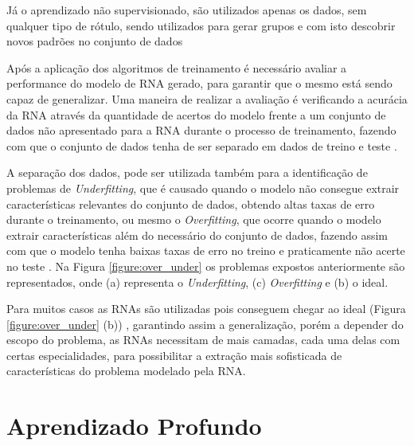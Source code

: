 \par Já o aprendizado não supervisionado, são utilizados apenas os dados, sem qualquer tipo de rótulo, sendo utilizados para gerar grupos \cite{Camila2017} e com isto descobrir novos padrões no conjunto de dados \cite{murphy2012}

\par Após a aplicação dos algoritmos de treinamento é necessário avaliar a performance do modelo de RNA gerado, para garantir que o mesmo está sendo capaz de generalizar. Uma maneira de realizar a avaliação é verificando a acurácia da RNA através da quantidade de acertos do modelo frente a um conjunto de dados não apresentado para a RNA durante o processo de treinamento, fazendo com que o conjunto de dados tenha de ser separado em dados de treino e teste \cite{Goodfellow-et-al-2016}.

\par A separação dos dados, pode ser utilizada também para a identificação de problemas de \textit{Underfitting}, que é causado quando o modelo não consegue extrair características relevantes do conjunto de dados, obtendo altas taxas de erro durante o treinamento, ou mesmo o \textit{Overfitting}, que ocorre quando o modelo extrair características além do necessário do conjunto de dados, fazendo assim com que o modelo tenha baixas taxas de erro no treino e praticamente não acerte no teste \cite{Goodfellow-et-al-2016}. Na Figura \ref{figure:over_under} os problemas expostos anteriormente são representados, onde (a) representa o \textit{Underfitting}, (c) \textit{Overfitting} e (b) o ideal. 


\par Para muitos casos as RNAs são utilizadas pois conseguem chegar ao ideal (Figura \ref{figure:over_under} (b)) \cite{Goodfellow-et-al-2016}, garantindo assim a generalização, porém a depender do escopo do problema, as RNAs necessitam de mais camadas, cada uma delas com certas especialidades, para possibilitar a extração mais sofisticada de características do problema modelado pela RNA.

\section{Aprendizado Profundo}


